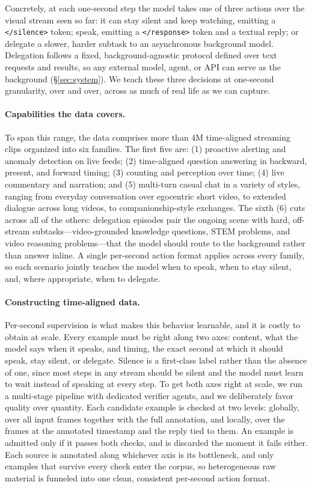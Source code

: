 Concretely, at each one-second step the model takes one of three actions over the visual stream seen so far: it can stay silent and keep watching, emitting a \texttt{</silence>} token; speak, emitting a \texttt{</response>} token and a textual reply; or delegate a slower, harder subtask to an asynchronous background model. Delegation follows a fixed, background-agnostic protocol defined over text requests and results, so any external model, agent, or API can serve as the background (\S\ref{sec:system}). We teach these three decisions at one-second granularity, over and over, across as much of real life as we can capture.

\paragraph{\textbf{Capabilities the data covers.}}
To span this range, the data comprises more than 4M time-aligned streaming clips organized into six families. The first five are: (1) proactive alerting and anomaly detection on live feeds; (2) time-aligned question answering in backward, present, and forward timing; (3) counting and perception over time; (4) live commentary and narration; and (5) multi-turn casual chat in a variety of styles, ranging from everyday conversation over egocentric short video, to extended dialogue across long videos, to companionship-style exchanges. The sixth (6) cuts across all of the others: delegation episodes pair the ongoing scene with hard, off-stream subtasks—video-grounded knowledge questions, STEM problems, and video reasoning problems—that the model should route to the background rather than answer inline. A single per-second action format applies across every family, so each scenario jointly teaches the model when to speak, when to stay silent, and, where appropriate, when to delegate.

\paragraph{\textbf{Constructing time-aligned data.}}
Per-second supervision is what makes this behavior learnable, and it is costly to obtain at scale. Every example must be right along two axes: content, what the model says when it speaks, and timing, the exact second at which it should speak, stay silent, or delegate. Silence is a first-class label rather than the absence of one, since most steps in any stream should be silent and the model must learn to wait instead of speaking at every step. To get both axes right at scale, we run a multi-stage pipeline with dedicated verifier agents, and we deliberately favor quality over quantity. Each candidate example is checked at two levels: globally, over all input frames together with the full annotation, and locally, over the frames at the annotated timestamp and the reply tied to them. An example is admitted only if it passes both checks, and is discarded the moment it fails either. Each source is annotated along whichever axis is its bottleneck, and only examples that survive every check enter the corpus, so heterogeneous raw material is funneled into one clean, consistent per-second action format.

